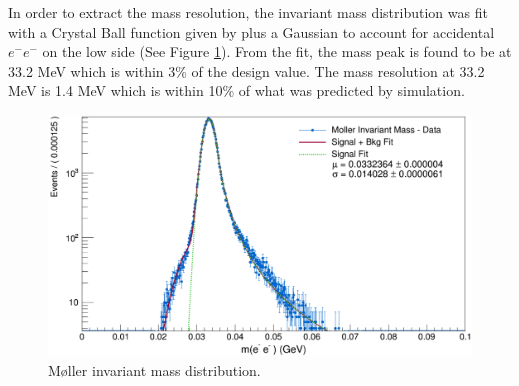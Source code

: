 In order to extract the mass resolution, the invariant mass distribution was 
fit with a Crystal Ball function \cite{Gaiser:1982yw} given by 
%
plus a Gaussian to account for accidental 
$e^-e^-$ on the low side (See Figure \ref{fig:moller_mass}).  From the 
fit, the mass peak is found to be at 33.2 MeV which is within 3\% of the design
value.  The mass resolution at 33.2 MeV is 1.4 MeV which is within 10\% of what
was predicted by simulation.
\begin{figure}[h!t]
    \centering
    \includegraphics[width=\textwidth]{images/moller_invariant_mass.png}
    \caption{M\o ller invariant mass distribution.}
    \label{fig:moller_mass}
\end{figure}

